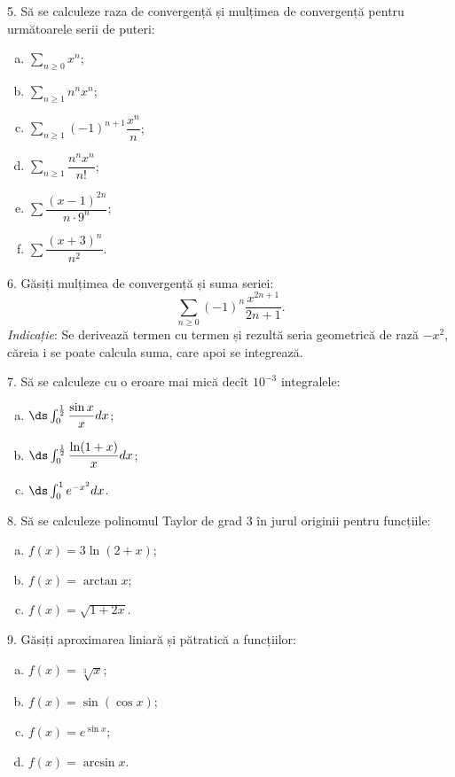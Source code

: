 
5. Să se calculeze raza de convergență și mulțimea de convergență pentru
următoarele serii de puteri:
\begin{enumerate}[(a)]
\item $ \sum_{n \geq 0} x^n $;
\item $ \sum_{n \geq 1} n^n x^n $;
\item $ \sum_{n \geq 1} (-1)^{n+1} \dfrac{x^n}{n} $;
\item $ \sum_{n \geq 1} \dfrac{n^nx^n}{n!} $;
\item $ \sum \dfrac{(x - 1)^{2n}}{n \cdot 9^n} $;
\item $ \sum \dfrac{(x + 3)^n}{n^2} $.
\end{enumerate}

\vspace{1cm}

6. Găsiți mulțimea de convergență și suma seriei:
\[
  \sum_{n \geq 0} (-1)^n \frac{x^{2n+1}}{2n + 1}.
\]
\emph{Indicație}: Se derivează termen cu termen și rezultă seria
geometrică de rază $ -x^2 $, căreia i se poate calcula suma, care apoi
se integrează.

\vspace{1cm}

7. Să se calculeze cu o eroare mai mică decît $ 10^{-3}$ integralele:
\begin{enumerate}[(a)]
\item $ \ds\int_0^{\frac{1}{2}} \dfrac{\sin x}{x} dx $;
\item $ \ds\int_0^{\frac{1}{2}} \dfrac{\ln(1 + x)}{x} dx $;
\item $ \ds\int_0^1 e^{-x^2} dx $.
\end{enumerate}


\vspace{1cm}

8. Să se calculeze polinomul Taylor de grad 3 în jurul originii
pentru funcțiile:
\begin{enumerate}[(a)]
\item $ f(x) = 3 \ln(2 + x) $;
\item $ f(x) = \arctan x $;
\item $ f(x) = \sqrt{1 + 2x} $.
\end{enumerate}


9. Găsiți aproximarea liniară și pătratică a funcțiilor:
\begin{enumerate}[(a)]
\item $ f(x) = \sqrt[3]{x} $;
\item $ f(x) = \sin(\cos x) $;
\item $ f(x) = e^{\sin x} $;
\item $ f(x) = \arcsin x $.
\end{enumerate}

